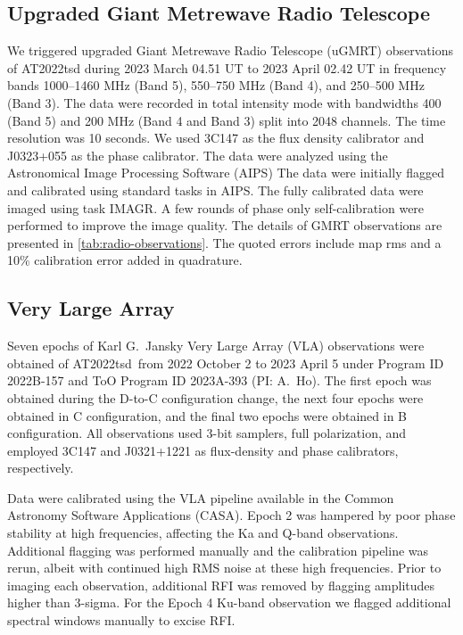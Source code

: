 \documentclass{nature_plusfigure}
\newcommand{\at}{AT2022tsd}
\begin{document}
\begin{methods}
\subsection{Upgraded Giant Metrewave Radio Telescope}
\label{sec:GMRT}

We triggered upgraded Giant Metrewave Radio Telescope (uGMRT) observations of AT2022tsd
during 2023 March 04.51 UT to 2023 April 02.42 UT in frequency bands 1000--1460 MHz
(Band 5), 550--750 MHz (Band 4), and 250--500 MHz (Band 3). The data were recorded
in total intensity mode with bandwidths 400 (Band 5) and 200 MHz (Band 4 and Band 3)
split into 2048 channels. The time resolution was 10 seconds. We used 3C147 as the flux density
calibrator and J0323+055 as the phase calibrator.
The data were analyzed\cite{Nayana2017} using the Astronomical Image Processing Software (AIPS\cite{Greisen2003})
The data were initially flagged and calibrated using standard tasks in AIPS. The fully calibrated data were imaged
using task IMAGR. A few rounds of phase only self-calibration were performed to improve the
image quality. The details of GMRT observations are presented in \ref{tab:radio-observations}. The quoted errors
include map rms and a 10\% calibration error added in quadrature.

\subsection{Very Large Array}
\label{sec:VLA}

Seven epochs of Karl G.\ Jansky Very Large Array (VLA\cite{Perley2011}) observations were obtained of \at\ from 2022 October 2 to 2023 April 5 under Program ID 2022B-157 and ToO Program ID 2023A-393 (PI: A.\ Ho).
The first epoch was obtained during the D-to-C configuration change, the next four epochs were obtained in C configuration, and the final two epochs were obtained in B configuration.
All observations used 3-bit samplers, full polarization, and employed 3C147 and J0321+1221 as flux-density and phase calibrators, respectively.

Data were calibrated using the VLA pipeline available in the Common Astronomy Software Applications (CASA\cite{McMullin2007}).
Epoch 2 was hampered by poor phase stability at high frequencies, affecting the Ka and Q-band observations. Additional flagging was performed manually and the calibration pipeline was rerun, albeit with continued high RMS noise at these high frequencies.
Prior to imaging each observation, additional RFI was removed by flagging amplitudes higher than 3-sigma.
For the Epoch 4 Ku-band observation we flagged additional spectral windows manually to excise RFI.


\end{methods}
\end{document}
